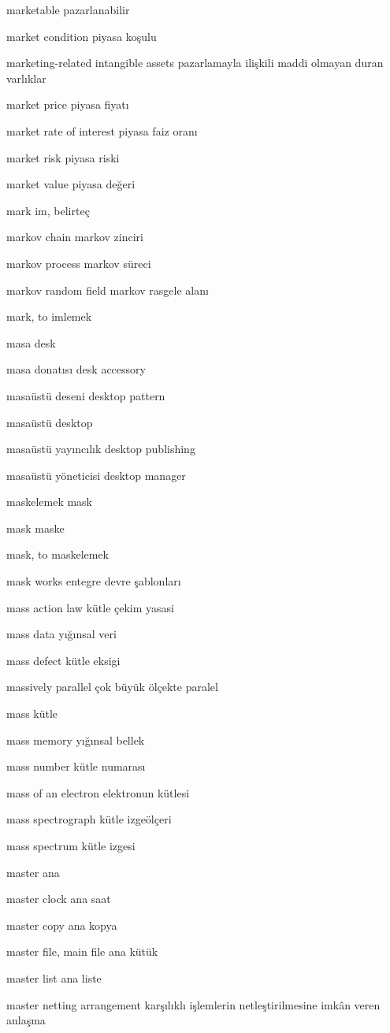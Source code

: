 \documentclass[12pt,fleqn]{article}\usepackage{../../common}
\begin{document}
marketable pazarlanabilir

market condition piyasa koşulu

marketing-related intangible assets pazarlamayla ilişkili maddi olmayan duran varlıklar

market price piyasa fiyatı

market rate of interest piyasa faiz oranı

market risk piyasa riski

market value piyasa değeri

mark im, belirteç

markov chain markov zinciri

markov process markov süreci

markov random field markov rasgele alanı

mark, to imlemek

masa desk

masa donatısı desk accessory

masaüstü deseni desktop pattern

masaüstü desktop

masaüstü yayıncılık desktop publishing

masaüstü yöneticisi desktop manager

maskelemek mask

mask maske

mask, to maskelemek

mask works entegre devre şablonları

mass action law kütle çekim yasasi

mass data yığınsal veri

mass defect kütle eksigi

massively parallel çok büyük ölçekte paralel

mass kütle

mass memory yığınsal bellek

mass number kütle numarası

mass of an electron elektronun kütlesi

mass spectrograph kütle izgeölçeri

mass spectrum kütle izgesi

master ana

master clock ana saat

master copy ana kopya

master file, main file ana kütük

master list ana liste

master netting arrangement karşılıklı işlemlerin netleştirilmesine imkân veren anlaşma
\end{document}
